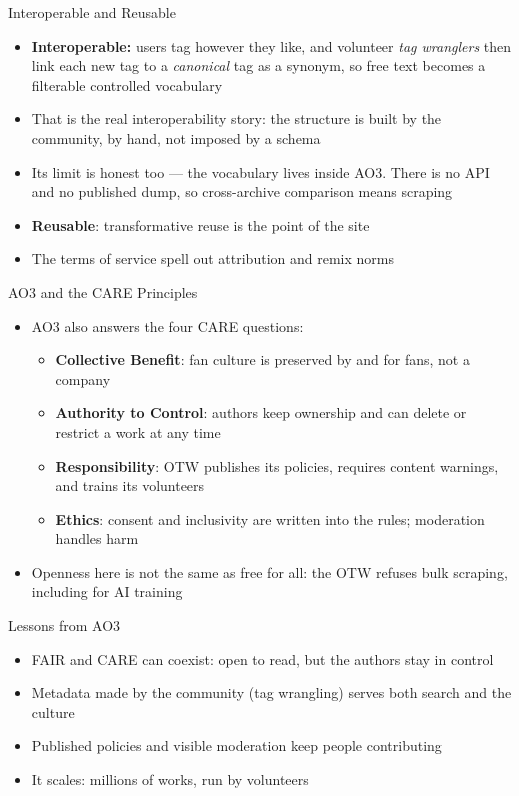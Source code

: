 \documentclass[aspectratio=169]{beamer}
\begin{document}
\begin{frame}{Interoperable and Reusable}
\begin{itemize}
  \item \textbf{Interoperable:} users tag however they like, and volunteer
    \emph{tag wranglers} then link each new tag to a \emph{canonical} tag as a
    synonym, so free text becomes a filterable controlled vocabulary
  \item That is the real interoperability story: the structure is built by the
    community, by hand, not imposed by a schema
  \item Its limit is honest too --- the vocabulary lives inside AO3.  There is
    no API and no published dump, so cross-archive comparison means scraping
  \item \textbf{Reusable}: transformative reuse is the point of the site
  \item The terms of service spell out attribution and remix norms
\end{itemize}
\end{frame}

\begin{frame}{AO3 and the CARE Principles}
\begin{itemize}
  \item AO3 also answers the four CARE questions:
    \begin{itemize}
    \item \textbf{Collective Benefit}: fan culture is preserved by and for fans, not a company
    \item \textbf{Authority to Control}: authors keep ownership and can delete or restrict a work at any time
    \item \textbf{Responsibility}: OTW publishes its policies, requires content warnings, and trains its volunteers
    \item \textbf{Ethics}: consent and inclusivity are written into the rules; moderation handles harm
    \end{itemize}
  \item Openness here is not the same as free for all: the OTW refuses bulk scraping, including for AI training
\end{itemize}
\end{frame}

\begin{frame}{Lessons from AO3}
\begin{itemize}
  \item FAIR and CARE can coexist: open to read, but the authors stay in control
  \item Metadata made by the community (tag wrangling) serves both search and the culture
  \item Published policies and visible moderation keep people contributing
  \item It scales: millions of works, run by volunteers
\end{itemize}
\end{frame}
\end{document}
